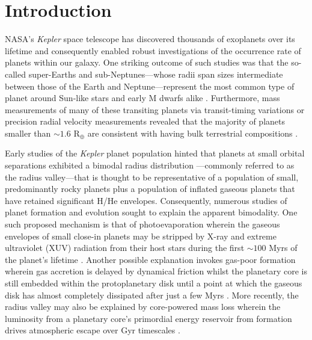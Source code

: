 \documentclass[twocolumn]{emulateapj}
\newcommand{\kepler}[1]{\emph{Kepler}#1}
\begin{document}
\section{Introduction}
NASA's \kepler{} space telescope has discovered thousands of exoplanets over its lifetime and
consequently enabled robust investigations of the occurrence rate of planets within our galaxy.
One striking outcome of such studies was that the so-called super-Earths and sub-Neptunes---whose
radii span sizes intermediate between those of the Earth and Neptune---represent the most common
type of planet around Sun-like stars and early M dwarfs alike
\citep[e.g.][]{youdin11,howard12,dressing13,fressin13,petigura13b,morton14,dressing15a,mulders15,gaidos16,fulton17,hardegree19}.
Furthermore, mass measurements of many of these transiting planets via transit-timing variations
or precision radial velocity measurements revealed that the majority of planets
smaller than $\sim 1.6$ R$_{\oplus}$ are consistent with having bulk terrestrial compositions
\citep[e.g.][]{weiss14,dressing15b,rogers15}.

Early studies of the \kepler{} planet population
hinted that planets at small orbital separations exhibited a
bimodal radius distribution \citep[e.g.][]{owen13}---commonly referred to as the radius valley---that
is thought to be representative of a population of small, predominantly rocky planets plus a population
of inflated gaseous planets that have retained significant H/He envelopes.
Consequently, numerous studies of planet formation and evolution sought to explain the
apparent bimodality. One such proposed mechanism is
that of photoevaporation wherein the gaseous envelopes of small close-in planets may be stripped by
X-ray and extreme ultraviolet (XUV) radiation from their host stars during the first $\sim 100$ Myrs
of the planet's lifetime
\citep{jackson12,owen13,jin14,lopez14,chen16,owen17,jin18,lopez18}. Another possible explanation
invokes gas-poor formation wherein gas accretion is delayed by dynamical friction whilst the
planetary core is still embedded within the protoplanetary disk until a point at which the gaseous disk
has almost completely dissipated after just a few Myrs \citep{lee14,lee16,lopez18}. More recently,
the radius valley may also be explained by core-powered mass loss wherein the
luminosity from a planetary core's primordial energy reservoir from formation drives atmospheric escape
over Gyr timescales \citep{ginzburg18,gupta19a,gupta19b}.
\end{document}
